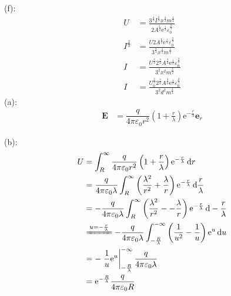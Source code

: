 (f):
\begin{align*}
    U&=\frac{3^{\frac{4}{3}}I^\frac{2}{3}x^{\frac{4}{3}}{m}^\frac{1}{4}}{2A^\frac{1}{2}\mathrm{e}^\frac{1}{3}\varepsilon_0^\frac{2}{3}}\\
    I^\frac{2}{3}&=\frac{U2A^\frac{1}{2}\mathrm{e}^\frac{1}{3}\varepsilon_0^\frac{2}{3}}{3^{\frac{4}{3}}x^{\frac{4}{3}}{m}^\frac{1}{4}}\\
    I&=\frac{U^\frac{3}{2}2^\frac{3}{2}A^\frac{3}{4}\mathrm{e}^\frac{1}{2}\varepsilon_0^\frac{2}{3}}{3^2x^2{m}^\frac{3}{2}}\\
    I&=\frac{U_0^\frac{3}{2}2^\frac{3}{2}A^\frac{3}{4}\mathrm{e}^\frac{1}{2}\varepsilon_0^\frac{2}{3}}{3^2d^2{m}^\frac{3}{2}}
\end{align*}
(a):
\begin{align*}
    \boldsymbol{E}&=\dfrac{q}{4\pi\varepsilon_0r^2}\left(1+\frac{r}{\lambda}\right)\mathrm{e}^{-\frac{r}{\lambda}}\boldsymbol{e}_r
\end{align*}

(b):
\begin{align*}
    U&=\int_{R}^{\infty}\dfrac{q}{4\pi\varepsilon_0r^2}\left(1+\frac{r}{\lambda}\right)\mathrm{e}^{-\frac{r}{\lambda}}\dif r\\
    &=\dfrac{q}{4\pi\varepsilon_0\lambda}\int_{R}^{\infty}\left(\frac{\lambda^2}{r^2}+\frac{\lambda}{r}\right)\mathrm{e}^{-\frac{r}{\lambda}}\dif \frac{r}{\lambda}\\
    &=-\dfrac{q}{4\pi\varepsilon_0\lambda}\int_{R}^{\infty}\left(\frac{\lambda^2}{r^2}--\frac{\lambda}{r}\right)\mathrm{e}^{-\frac{r}{\lambda}}\dif -\frac{r}{\lambda}\\
    &\xlongequal{u=-\frac{r}{\lambda}}-\dfrac{q}{4\pi\varepsilon_0\lambda}\int_{-\frac{R}{\lambda}}^{-\infty}\left(\frac{1}{u^2}-\frac{1}{u}\right)\mathrm{e}^{u}\dif u\\
    &=-\left.\frac{1}{u}\mathrm{e}^{u}\right|_{-\frac{R}{\lambda}}^{-\infty}\dfrac{q}{4\pi\varepsilon_0\lambda}\\
    &=\mathrm{e}^{-\frac{R}{\lambda}}\dfrac{q}{4\pi\varepsilon_0R}
\end{align*}

